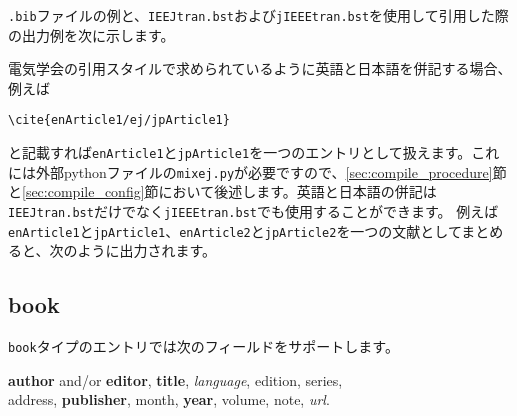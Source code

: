 \documentclass[10pt, a4paper]{jsarticle}
\renewcommand{\refname}{\small 参考文献}
\newcommand{\putlst}[1]{
  \noindent\makebox[\linewidth]{\rule{\linewidth}{0.4pt}}\vspace{-1.5zw}
  \vspace{-1.8zw}
  \noindent\makebox[\linewidth]{\rule{\linewidth}{0.4pt}}\vspace{0.5zw}\par
}
\begin{document}
\texttt{.bib}ファイルの例と、\texttt{IEEJtran.bst}および\texttt{jIEEEtran.bst}を使用して引用した際の出力例を次に示します。

\putlst{article.bib}

\begin{bibunit}[IEEJtran]
  \nocite{Article,jpArticle1,jpArticle2,jpArticle3,enArticle1,enArticle2,enArticle3,enArticle4}
  \renewcommand{\refname}{\small 参考文献(IEEJtran.bst)}
  {\small \putbib[article]}
\end{bibunit}
\begin{bibunit}[jIEEEtran]
  \nocite{Article,jpArticle1,jpArticle2,jpArticle3,enArticle1,enArticle2,enArticle3,enArticle4}
  \renewcommand{\refname}{\small 参考文献(jIEEEtran.bst)}
  {\small \putbib[article]}
\end{bibunit}

\vspace{2em}
電気学会の引用スタイルで求められているように英語と日本語を併記する場合、例えば
\begin{center}
  \verb*|\cite{enArticle1/ej/jpArticle1}|
\end{center}
と記載すれば\texttt{enArticle1}と\texttt{jpArticle1}を一つのエントリとして扱えます。これには外部pythonファイルの\texttt{mixej.py}が必要ですので、\ref{sec:compile_procedure}節と\ref{sec:compile_config}節において後述します。英語と日本語の併記は\texttt{IEEJtran.bst}だけでなく\texttt{jIEEEtran.bst}でも使用することができます。
例えば\texttt{enArticle1}と\texttt{jpArticle1}、\texttt{enArticle2}と\texttt{jpArticle2}を一つの文献としてまとめると、次のように出力されます。

\begin{bibunit}[IEEJtran]
  \nocite{enArticle1/ej/jpArticle1,enArticle2/ej/jpArticle2}
  \renewcommand{\refname}{\small 英日を併記した参考文献(IEEJtran.bst)}
  {\small \putbib[article]}
\end{bibunit}
\begin{bibunit}[jIEEEtran]
  \nocite{enArticle1/ej/jpArticle1,enArticle2/ej/jpArticle2}
  \renewcommand{\refname}{\small 英日を併記した参考文献(jIEEEtran.bst)}
  {\small \putbib[article]}
\end{bibunit}


\subsection{book}

\texttt{book}タイプのエントリでは次のフィールドをサポートします。

\begin{center}
  \textbf{author} and/or \textbf{editor}, \textbf{title}, \textsl{language}, edition,
  series, \\
  address, \textbf{publisher}, month, \textbf{year}, volume, note, \textsl{url}.
\end{center}
\end{document}
